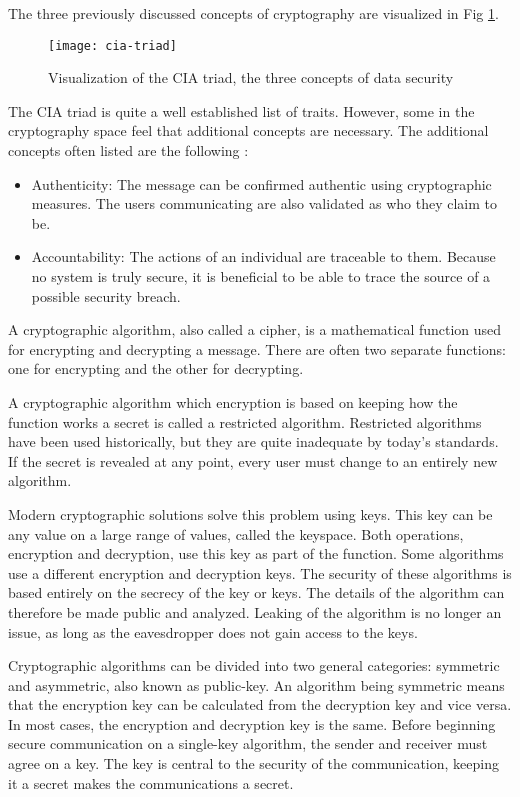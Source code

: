 The three previously discussed concepts of cryptography are visualized in Fig \ref{fig:cryptography-concepts}.

\begin{figure}[!htb]
\centering
\texttt{[image: cia-triad]}
\caption{Visualization of the CIA triad, the three concepts of data security}
\label{fig:cryptography-concepts}
\end{figure}

The CIA triad is quite a well established list of traits.
However, some in the cryptography space feel that additional concepts are necessary.
The additional concepts often listed are the following \cite{crypto-principles}:
\begin{itemize}
    \item Authenticity: The message can be confirmed authentic using cryptographic measures.
    The users communicating are also validated as who they claim to be.
    \item Accountability: The actions of an individual are traceable to them.
    Because no system is truly secure, it is beneficial to be able to trace the source of a possible security breach.
\end{itemize}

A cryptographic algorithm, also called a cipher, is a mathematical function used for encrypting and decrypting a message.
There are often two separate functions: one for encrypting and the other for decrypting.
\cite{applied-crypto}

A cryptographic algorithm which encryption is based on keeping how the function works a secret is called a restricted algorithm.
Restricted algorithms have been used historically, but they are quite inadequate by today's standards.
If the secret is revealed at any point, every user must change to an entirely new algorithm.
\cite{applied-crypto}

Modern cryptographic solutions solve this problem using keys.
This key can be any value on a large range of values, called the keyspace.
Both operations, encryption and decryption, use this key as part of the function.
Some algorithms use a different encryption and decryption keys.
The security of these algorithms is based entirely on the secrecy of the key or keys.
The details of the algorithm can therefore be made public and analyzed.
Leaking of the algorithm is no longer an issue, as long as the eavesdropper does not gain access to the keys.
\cite{applied-crypto}

Cryptographic algorithms can be divided into two general categories: symmetric and asymmetric, also known as public-key.
An algorithm being symmetric means that the encryption key can be calculated from the decryption key and vice versa.
In most cases, the encryption and decryption key is the same.
Before beginning secure communication on a single-key algorithm, the sender and receiver must agree on a key.
The key is central to the security of the communication, keeping it a secret makes the communications a secret.
\cite{applied-crypto}

